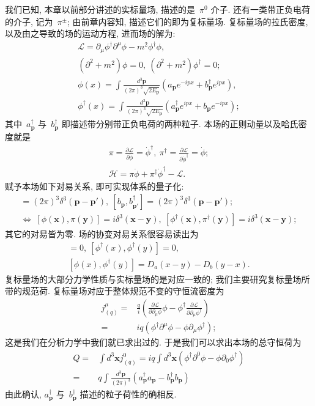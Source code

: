 我们已知, 本章以前部分讲述的实标量场, 描述的是~$\pi^0$ 介子. 还有一类带正负电荷的介子, 记为~$\pi^\pm$; 由前章内容知, 描述它们的即为复标量场. 复标量场的拉氏密度, 以及由之导致的场的运动方程, 进而场的解为:
\begin{gather}
\mathcal{L}=\partial_\mu\phi^\dag\partial^\mu\phi-m^2\phi^\dag\phi,\\
(\partial^2+m^2)\phi=0,~(\partial^2+m^2)\phi^\dag=0;\\
\phi(x)=\int\frac{d^3\bm{p}}{(2\pi)^3\sqrt{2E_{\bm{p}}}}\left(a_{\bm{p}}e^{-ipx}+b^\dag_{\bm{p}}e^{ipx}\right),\\
\phi^\dag(x)=\int\frac{d^3\bm{p}}{(2\pi)^3\sqrt{2E_{\bm{p}}}}\left(a^\dag_{\bm{p}}e^{ipx}+b_{\bm{p}}e^{-ipx}\right);
\end{gather}
其中~$a^\dag_{\bm{p}}$ 与~$b^\dag_{\bm{p}}$ 即描述带分别带正负电荷的两种粒子. 本场的正则动量以及哈氏密度就是
\begin{gather}
\pi=\frac{\partial\mathcal{L}}{\partial\dot{\phi}}=\dot{\phi}^\dag,~\pi^\dag=\frac{\partial\mathcal{L}}{\partial\dot{\phi}^\dag}=\dot{\phi};\\
\mathcal{H}=\pi\dot{\phi}+\pi^\dag\dot{\phi}^\dag-\mathcal{L}.
\end{gather}
赋予本场如下对易关系, 即可实现体系的量子化:
\begin{gather}
[a_{\bm{p}},a^\dag_{\bm{p}'}]=(2\pi)^3\delta^3(\bm{p}-\bm{p}'),~[b_{\bm{p}},b^\dag_{\bm{p}'}]=(2\pi)^3\delta^3(\bm{p}-\bm{p}');\\
\Leftrightarrow~[\phi(\bm{x}),\pi(\bm{y})]=i\delta^3(\bm{x}-\bm{y}),~[\phi^\dag(\bm{x}),\pi^\dag(\bm{y})]=i\delta^3(\bm{x}-\bm{y});
\end{gather}
其它的对易皆为零. 场的协变对易关系很容易读出为~
\begin{gather}
[\phi(x),\phi(y)]=0,~[\phi^\dag(x),\phi^\dag(y)]=0,\\
[\phi(x),\phi^\dag(y)]=D_a(x-y)-D_b(y-x).
\end{gather}
复标量场的大部分力学性质与实标量场的是对应一致的; 我们主要研究复标量场所带的规范荷. 复标量场对应于整体规范不变的守恒流密度为
\begin{align}
j^\mu_{(q)}=&\frac{q}{i}\left(\frac{\partial\mathcal{L}}{\partial\partial_\mu\phi}\phi-\phi^\dag\frac{\partial\mathcal{L}}{\partial\partial_\mu\phi^\dag}\right)\nonumber\\
=&iq(\phi^\dag\partial^\mu\phi-\phi\partial_\mu\phi^\dag);
\end{align}
这是我们在分析力学中我们就已求出过的. 于是我们可以求出本场的总守恒荷为
\begin{align}
Q=&\int d^3\bm{x}j^0_{(q)}=iq\int d^3\bm{x}(\phi^\dag\partial^0\phi-\phi\partial_0\phi^\dag)\nonumber\\
=&q\int\frac{d^3\bm{p}}{(2\pi)^3}(a^\dag_{\bm{p}}a_{\bm{p}}-b^\dag_{\bm{p}}b_{\bm{p}})
\end{align}
由此确认, $a^\dag_{\bm{p}}$ 与~$b^\dag_{\bm{p}}$ 描述的粒子荷性的确相反.












